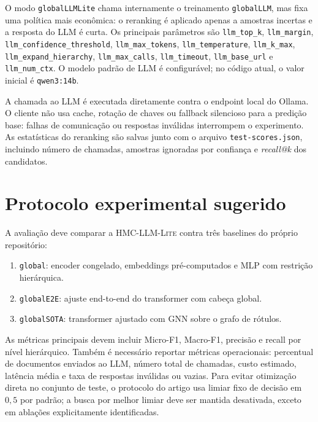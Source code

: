 \documentclass[11pt,a4paper]{article}
\newcommand{\method}{\textsc{HMC-LLM-Lite}}
\begin{document}
O modo \texttt{globalLLMLite} chama internamente o treinamento
\texttt{globalLLM}, mas fixa uma política mais econômica: o reranking é aplicado
apenas a amostras incertas e a resposta do LLM é curta. Os principais parâmetros
são \texttt{llm\_top\_k}, \texttt{llm\_margin},
\texttt{llm\_confidence\_threshold}, \texttt{llm\_max\_tokens},
\texttt{llm\_temperature}, \texttt{llm\_k\_max},
\texttt{llm\_expand\_hierarchy}, \texttt{llm\_max\_calls},
\texttt{llm\_timeout}, \texttt{llm\_base\_url} e \texttt{llm\_num\_ctx}.
O modelo padrão de LLM é configurável; no código atual, o valor inicial é
\texttt{qwen3:14b}.

A chamada ao LLM é executada diretamente contra o endpoint local do Ollama. O
cliente não usa cache, rotação de chaves ou fallback silencioso para a predição
base: falhas de comunicação ou respostas inválidas interrompem o experimento.
As estatísticas do reranking são salvas junto com o arquivo
\texttt{test-scores.json}, incluindo número de chamadas, amostras ignoradas por
confiança e \textit{recall@k} dos candidatos.

\section{Protocolo experimental sugerido}

A avaliação deve comparar a \method{} contra três baselines do próprio
repositório:

\begin{enumerate}[leftmargin=*, itemsep=2pt]
  \item \texttt{global}: encoder congelado, embeddings pré-computados e MLP com
        restrição hierárquica.
  \item \texttt{globalE2E}: ajuste end-to-end do transformer com cabeça global.
  \item \texttt{globalSOTA}: transformer ajustado com GNN sobre o grafo de
        rótulos.
\end{enumerate}

As métricas principais devem incluir Micro-F1, Macro-F1, precisão e recall por
nível hierárquico. Também é necessário reportar métricas operacionais:
percentual de documentos enviados ao LLM, número total de chamadas, custo
estimado, latência média e taxa de respostas inválidas ou vazias.
Para evitar otimização direta no conjunto de teste, o protocolo do artigo usa
limiar fixo de decisão em $0{,}5$ por padrão; a busca por melhor limiar deve ser
mantida desativada, exceto em ablações explicitamente identificadas.
\end{document}
